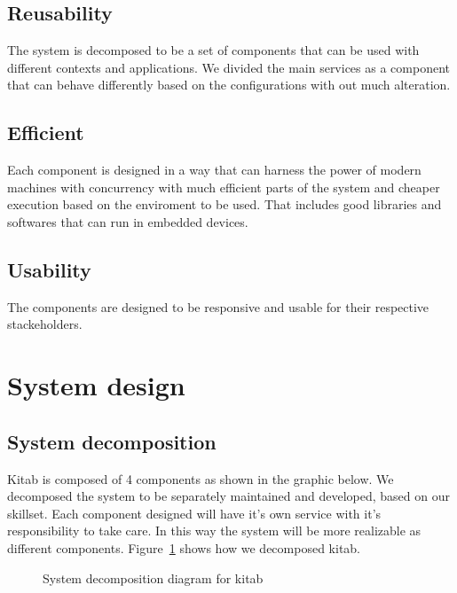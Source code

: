 \subsection{Reusability}
The system is decomposed to be a set of components that can be used with different contexts and applications. We divided the main services as a component that can behave differently based on the configurations with out much alteration.

\subsection{Efficient}
Each component is designed in a way that can harness the power of modern machines with concurrency with much efficient parts of the system and cheaper execution based on the enviroment to be used. That includes good libraries and softwares that can run in embedded devices.

\subsection{Usability}
The components are designed to be responsive and usable for their respective stackeholders.

\section{System design}
	\subsection{System decomposition}

Kitab is composed of 4 components as shown in the graphic below. We decomposed the system to be separately maintained and developed, based on our skillset. Each component designed will have it's own service with it's responsibility to take care. In this way the system will be more realizable as different components. Figure~\ref{dia_sys_decomposition} shows how we decomposed kitab.

	\begin{figure}[H]
	\begin{center}

	\caption{System decomposition diagram for kitab}
	\label{dia_sys_decomposition}

	\end{center}
	\end{figure}

